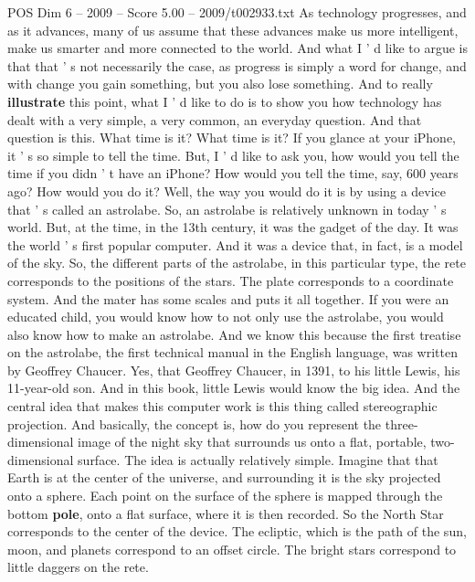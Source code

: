 \begin{textsample}{POS Dim 6 – 2009 – Score 5.00 – 2009/t002933.txt}  \label{ex:f6_pos_030}
As technology progresses, and as it advances, many of us assume that these advances make us more intelligent, make us smarter and more connected to the world.
And what I ' d like to argue is that that ' s not necessarily the case, as progress is simply a word for change, and with change you gain something, but you also lose something.
And to really \textbf{illustrate} this point, what I ' d like to do is to show you how technology has dealt with a very simple, a very common, an everyday question.
And that question is this.
What time is it?
What time is it?
If you glance at your iPhone, it ' s so simple to tell the time.
But, I ' d like to ask you, how would you tell the time if you didn ' t have an iPhone?
How would you tell the time, say, 600 years ago?
How would you do it?
Well, the way you would do it is by using a device that ' s called an astrolabe.
So, an astrolabe is relatively unknown in today ' s world.
But, at the time, in the 13th century, it was the gadget of the day.
It was the world ' s first popular computer.
And it was a device that, in fact, is a model of the sky.
So, the different parts of the astrolabe, in this particular type, the rete corresponds to the positions of the stars.
The plate corresponds to a coordinate system.
And the mater has some scales and puts it all together.
If you were an educated child, you would know how to not only use the astrolabe, you would also know how to make an astrolabe.
And we know this because the first treatise on the astrolabe, the first technical manual in the English language, was written by Geoffrey Chaucer.
Yes, that Geoffrey Chaucer, in 1391, to his little Lewis, his 11-year-old son.
And in this book, little Lewis would know the big idea.
And the central idea that makes this computer work is this thing called stereographic projection.
And basically, the concept is, how do you represent the three-dimensional image of the night sky that surrounds us onto a flat, portable, two-dimensional surface.
The idea is actually relatively simple.
Imagine that that Earth is at the center of the universe, and surrounding it is the sky projected onto a sphere.
Each point on the surface of the sphere is mapped through the bottom \textbf{pole}, onto a flat surface, where it is then recorded.
So the North Star corresponds to the center of the device.
The ecliptic, which is the path of the sun, moon, and planets correspond to an offset circle.
The bright stars correspond to little daggers on the rete.

\end{textsample}
